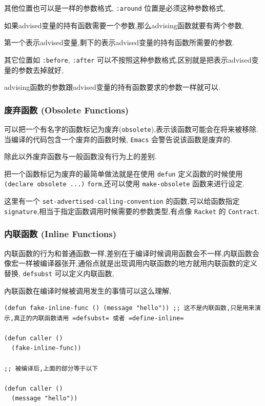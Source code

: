 \documentclass[11pt]{article}
\begin{document}
\begin{itemize}
\begin{itemize}
其他位置也可以是一样的参数格式, \texttt{:around} 位置是必须这种参数格式,

如果advised变量的持有函数需要一个参数,那么advising函数就要有两个参数,

第一个表示advised变量,剩下的表示advised变量的持有函数所需要的参数.

其它位置如 \texttt{:before}, \texttt{:after} 可以不按照这种参数格式,区别就是把表示advised变量的参数去掉就好,

advising函数的参数跟advised变量的持有函数要求的参数一样就可以.
\end{itemize}
\end{itemize}



\subsubsection{废弃函数 (Obsolete Functions)}
\label{sec:org84adc74}

可以把一个有名字的函数标记为废弃(\texttt{obsolete}),表示该函数可能会在将来被移除.当编译的代码包含一个废弃的函数时候, \texttt{Emacs} 会警告说该函数是废弃的.

除此以外废弃函数与一般函数没有行为上的差别.

把一个函数标记为废弃的最简单做法就是在使用 \texttt{defun} 定义函数的时候使用 \texttt{(declare obsolete ...)} \texttt{form},还可以使用 \texttt{make-obsolete} 函数来进行设定.

这里有一个 \texttt{set-advertised-calling-convention} 的函数,可以给函数指定 \texttt{signature},相当于指定函数调用时候需要的参数类型,有点像 \texttt{Racket} 的 \texttt{Contract}.



\subsubsection{内联函数 (Inline Functions)}
\label{sec:org5294563}

内联函数的行为和普通函数一样,差别在于编译时候调用函数会不一样,内联函数会像宏一样被编译器张开,通俗点就是出现调用内联函数的地方就用内联函数的定义替换, \texttt{defsubst} 可以定义内联函数,

內联函数在编译时候被调用发生的事情可以这么理解,


\begin{verbatim}
(defun fake-inline-func () (message "hello")) ;; 这不是内联函数,只是用来演示,真正的内联函数请用 =defsubst= 或者 =define-inline=

(defun caller ()
  (fake-inline-func))

;; 被编译后,上面的部分等于以下

(defun caller ()
  (message "hello"))
\end{verbatim}
\end{document}
